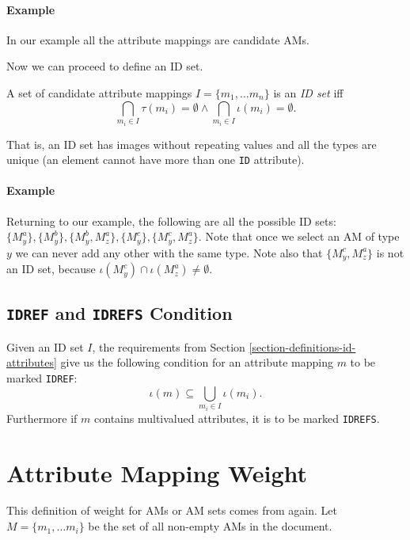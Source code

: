 \paragraph{Example}
In our example all the attribute mappings are candidate AMs.

Now we can proceed to define an ID set.

\begin{define}[ID set]
A set of candidate attribute mappings $I = \{m_1, \ldots m_n\}$ is an \textit{ID set} iff
\[\bigcap_{m_i \in I} \tau(m_i) = \emptyset \wedge \bigcap_{m_i \in I} \iota(m_i) = \emptyset.\]
\end{define}

That is, an ID set has images without repeating values and all the types are unique (an element cannot have more than one \texttt{ID} attribute).

\paragraph{Example}
Returning to our example, the following are all the possible ID sets: $\{ M_{y}^{a} \}, \{ M_{y}^{b} \}, \{ M_{y}^{b}, M_{z}^{a} \}, \{ M_{y}^{c} \}, \{ M_{y}^{c}, M_{z}^{a} \}$. Note that once we select an AM of type $y$ we can never add any other with the same type. Note also that $\{ M_{y}^{c}, M_{z}^{a} \}$ is not an ID set, because $\iota(M_{y}^{c}) \cap \iota(M_{z}^{a}) \neq \emptyset$.

\subsection*{\texttt{IDREF} and \texttt{IDREFS} Condition}

Given an ID set $I$, the requirements from Section \ref{section-definitions-id-attributes} give us the following condition for an attribute mapping $m$ to be marked \texttt{IDREF}:
\[\iota(m) \subseteq \bigcup_{m_i \in I} \iota(m_i).\]
Furthermore if $m$ contains multivalued attributes, it is to be marked \texttt{IDREFS}.

\section{Attribute Mapping Weight}
\label{section-definitions-weight}

This definition of weight for AMs or AM sets comes from \cite{fidax} again. Let $M = \{m_1, \dots m_i\}$ be the set of all non-empty AMs in the document.

